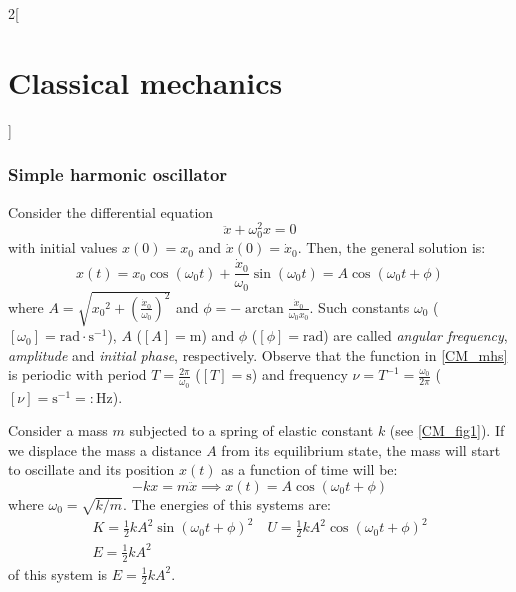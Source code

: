 \documentclass[../../../main.tex]{subfiles}
\begin{document}
\begin{multicols}{2}[\section{Classical mechanics}]
    \subsubsection{Simple harmonic oscillator}
    \begin{prop}
        Consider the differential equation $$\ddot{x}+\omega_0^2 x=0$$ with initial values $x(0)=x_0$ and $\dot{x}(0)=\dot{x}_0$. Then, the general solution is:
        \begin{equation}
            x(t)=x_0\cos(\omega_0t)+\frac{\dot{x}_0}{\omega_0}\sin(\omega_0t)=A\cos(\omega_0t+\phi)
            \label{CM_mhs}
        \end{equation} where $\displaystyle A=\sqrt{{x_0}^2+{\left(\frac{\dot{x}_0}{\omega_0}\right)}^2}$ and $\displaystyle \phi=-\arctan\frac{\dot{x}_0}{\omega_0x_0}$. Such constants $\omega_0$ ($[\omega_0]=\text{rad}\cdot \text{s}^{-1}$), $A$ ($[A]=\text{m}$) and $\phi$ ($[\phi]=\text{rad}$) are called \textit{angular frequency}, \textit{amplitude} and \textit{initial phase}, respectively. Observe that the function in \cref{CM_mhs} is periodic with period $T=\frac{2\pi}{\omega_0}$ ($[T]=\text{s}$) and frequency $\nu=T^{-1}=\frac{\omega_0}{2\pi}$ ($[\nu]=\text{s}^{-1}=:\text{Hz}$).
    \end{prop}
    \begin{prop}
        Consider a mass $m$ subjected to a spring of elastic constant $k$ (see \cref{CM_fig1}). If we displace the mass a distance $A$ from its equilibrium state, the mass will start to oscillate and its position $x(t)$ as a function of time will be:
        $$-kx=m\ddot{x}\implies x(t)=A\cos(\omega_0t+\phi)$$ where $\omega_0=\sqrt{k/m}$. The energies of this systems are:
        \begin{gather*}
            K=\frac{1}{2}kA^2\sin(\omega_0 t+\phi)^2\quad U=\frac{1}{2}kA^2\cos(\omega_0 t+\phi)^2\\
            E=\frac{1}{2}kA^2
        \end{gather*}
        of this system is $E=\frac{1}{2}kA^2$.
        \begin{center}
            \begin{minipage}{\linewidth}
                \centering
                
                \label{CM_fig1}
            \end{minipage}
        \end{center}
    \end{prop}

\end{multicols}
\end{document}
